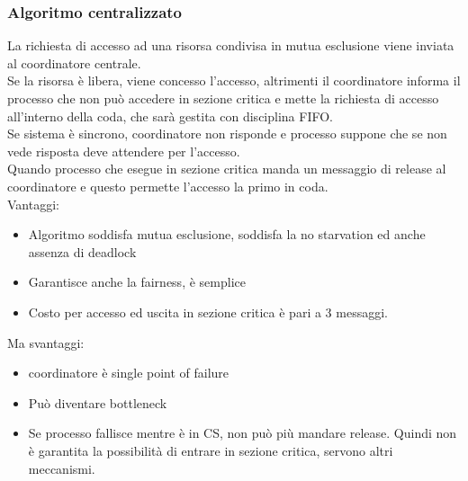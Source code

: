\documentclass[16px]{article}
\begin{document}
\subsubsection{Algoritmo centralizzato}
La richiesta di accesso ad una risorsa condivisa in mutua esclusione viene inviata al coordinatore centrale.\\ Se la risorsa è libera, viene concesso l'accesso, altrimenti il coordinatore informa il processo che non può accedere in sezione critica e mette la richiesta di accesso all'interno della coda, che sarà gestita con disciplina FIFO.\\ Se sistema è sincrono, coordinatore non risponde e processo suppone che se non vede risposta deve attendere per l'accesso.\\ Quando processo che esegue in sezione critica manda un messaggio di release al coordinatore e questo permette l'accesso la primo in coda.\\ Vantaggi:
\begin{itemize}
\item Algoritmo soddisfa mutua esclusione, soddisfa la no starvation ed anche assenza di deadlock
\item  Garantisce anche la fairness, è semplice 
\item Costo per accesso ed uscita in sezione critica è pari a 3 messaggi. 
\end{itemize}
Ma svantaggi: 
\begin{itemize}
\item coordinatore è single point of failure
\item Può diventare bottleneck
\item Se processo fallisce mentre è in CS, non può più mandare release. Quindi non è garantita la possibilità di entrare in sezione critica, servono altri meccanismi.
\end{itemize}
\end{document}
